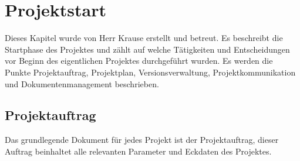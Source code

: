 \chapter{Projektstart}

Dieses Kapitel wurde von Herr Krause erstellt und betreut. Es beschreibt die Startphase des Projektes und zählt auf welche Tätigkeiten und Entscheidungen vor Beginn des eigentlichen Projektes durchgeführt wurden. Es werden die Punkte Projektauftrag, Projektplan, Versionsverwaltung, Projektkommunikation und Dokumentenmanagement beschrieben.

\section{Projektauftrag}

Das grundlegende Dokument für jedes Projekt ist der Projektauftrag, dieser Auftrag beinhaltet alle relevanten Parameter und Eckdaten des Projektes.

